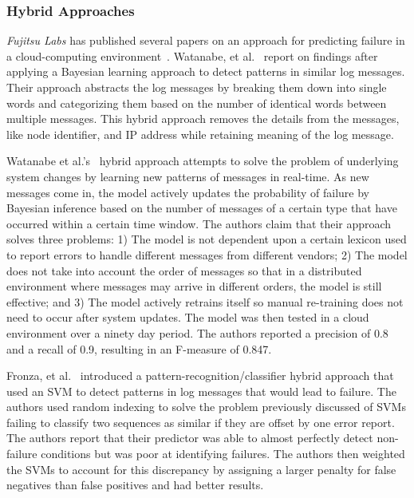 \subsubsection{Hybrid Approaches}
\emph{Fujitsu Labs} has published several papers on an approach for predicting
failure in a cloud-computing
environment~\cite{sonoda2012,watanabe2012,watanabe2014}.  Watanabe, et
al.~\cite{watanabe2012, watanabe2014} report on findings after applying a
Bayesian learning approach to detect patterns in similar log messages.  Their
approach abstracts the log messages by breaking them down into single words and
categorizing them based on the number of identical words between multiple
messages.  This hybrid approach removes the details from the messages, like
node identifier, and \ac{IP} address while retaining meaning of the log
message.

Watanabe et al.'s~\cite{watanabe2014} hybrid approach attempts to solve the
problem of underlying system changes by learning new patterns of messages in
real-time.  As new messages come in, the model actively updates the probability
of failure by Bayesian inference based on the number of messages of a certain
type that have occurred within a certain time window.  The authors claim that
their approach solves three problems: 1)  The model is not dependent upon a
certain lexicon used to report errors to handle different messages from
different vendors; 2) The model does not take into account the order of
messages so that in a distributed environment where messages may arrive in
different orders, the model is still effective; and 3)  The model actively
retrains itself so manual re-training does not need to occur after system
updates.  The model was then tested in a cloud environment over a ninety day
period.  The authors reported a precision of 0.8 and a recall of 0.9, resulting
in an F-measure of 0.847.  

Fronza, et al.~\cite{fronza2013} introduced a pattern-recognition/classifier
hybrid approach that used an \ac{SVM} to detect patterns in log messages that
would lead to failure.  The authors used random indexing to solve the problem
previously discussed of \ac{SVM}s failing to classify two sequences as similar
if they are offset by one error report.  The authors report that their
predictor was able to almost perfectly detect non-failure conditions but was
poor at identifying failures.  The authors then weighted the \ac{SVM}s to
account for this discrepancy by assigning a larger penalty for false negatives
than false positives and had better results.

